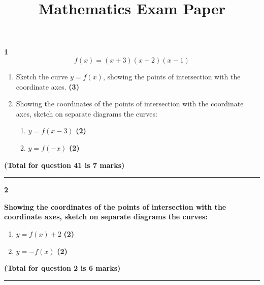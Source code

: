\documentclass[a4paper,12pt]{article}
\begin{document}
 
\title{\textbf{Mathematics Exam Paper}} %
\date{} %
\maketitle %

\begin{tcolorbox}
[width=\textwidth, height=\textheight, colframe=black, colback=white, arc=5mm, boxrule=0.2mm]


\textbf{1} \hspace{1em} 
\[f(x) = (x + 3)(x + 2)(x - 1)\] 

\begin{enumerate}[label=(\alph*)]
\item Sketch the curve \( y = f(x) \), showing the points of intersection with the coordinate axes. \hfill \textbf{(3)}
\item Showing the coordinates of the points of intersection with the coordinate axes, sketch on separate diagrams the curves:
    \begin{enumerate}[label=(\roman*)]
    \item \( y = f(x - 3) \) \hfill \textbf{(2)}
    \item \( y = f(-x) \) \hfill \textbf{(2)}
    \end{enumerate}
\end{enumerate}

\hfill \textbf{(Total for question 41 is 7 marks)}

\hrule height 0.4pt
\vspace{1em}


\textbf{2} \hspace{1em}

\textbf{Showing the coordinates of the points of intersection with the coordinate axes, sketch on separate diagrams the curves:}
\begin{enumerate}[label=(\alph*)]
\vfill
\item \( y = f(x) + 2 \) \hfill \textbf{(2)}
\item \( y = -f(x) \) \hfill \textbf{(2)}
\vfill
\end{enumerate}

\hfill \textbf{(Total for question 2 is 6 marks)}

\hrule height 0.4pt
\vspace{1em}



\end{tcolorbox}
\end{document}
